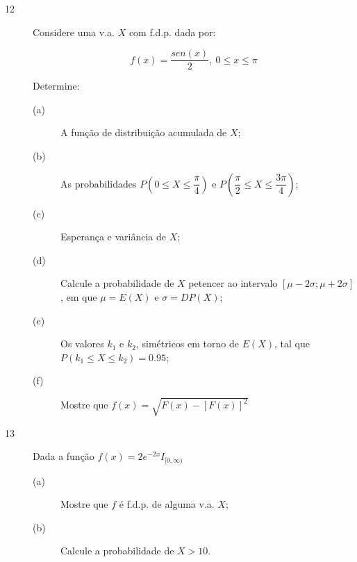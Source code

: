 \documentclass{report}
\begin{document}
\begin{description}

\item[{\large 12}] Considere uma v.a. $X$ com f.d.p. dada por:

$$f(x)=\dfrac{sen(x)}{2},\ 0\leq x \leq \pi$$

Determine:

\begin{description}

\item[(a)] A função de distribuição acumulada de $X$;
\item[(b)] As probabilidades $P(0\leq X\leq \dfrac{\pi}{4})$ e $P(\dfrac{\pi}{2}\leq X\leq \dfrac{3\pi}{4})$;
\item[(c)] Esperança e variância de $X$;
\item[(d)] Calcule a probabilidade de $X$ petencer ao intervalo $[\mu-2\sigma;\mu+2\sigma ]$, em que $\mu = E(X)$ e $\sigma = DP(X)$;
\item[(e)] Os valores $k_{1}$ e $k_{2}$, simétricos em torno de $E(X)$, tal que $P(k_{1} \leq X \leq k_{2} ) = 0.95$;
\item[(f)] Mostre que $f(x)=\sqrt{F(x)-[F(x)]^{2}}$

\end{description}

\end{description}


\begin{description}

\item[{\large 13}] Dada a função $f(x)=2 e^{-2x}I_{[0,\infty)}$


\begin{description}

\item[(a)] Mostre que $f$ é f.d.p. de alguma v.a. $X$;
\item[(b)] Calcule a probabilidade de $X>10$.

\end{description}

\end{description}

\newpage
\end{document}

